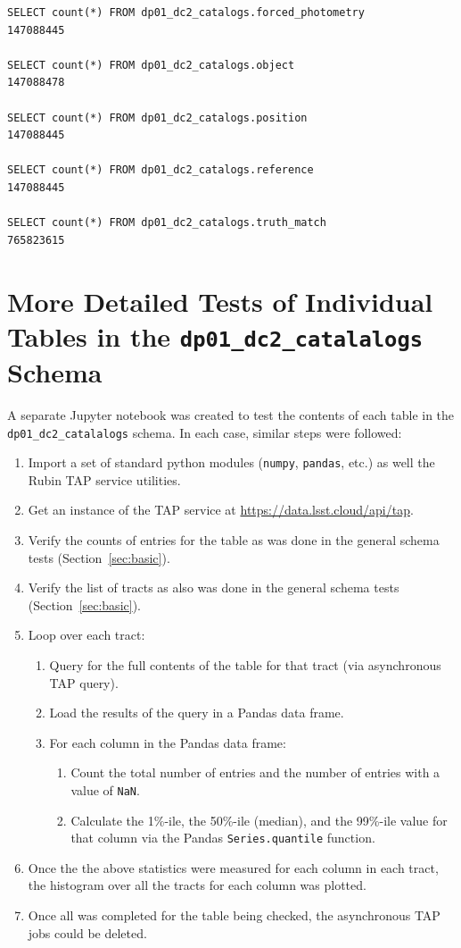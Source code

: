 \documentclass[DM,authoryear,toc]{lsstdoc}
\begin{document}
\lstset{language=SQL}
\begin{lstlisting}
SELECT count(*) FROM dp01_dc2_catalogs.forced_photometry
147088445

SELECT count(*) FROM dp01_dc2_catalogs.object
147088478

SELECT count(*) FROM dp01_dc2_catalogs.position
147088445
 
SELECT count(*) FROM dp01_dc2_catalogs.reference
147088445

SELECT count(*) FROM dp01_dc2_catalogs.truth_match
765823615
\end{lstlisting}


\section{More Detailed Tests of Individual Tables in the  \texttt{dp01\_dc2\_catalalogs} Schema} \label{sec:detailed}

A separate Jupyter notebook was created to test the contents of each
table in the \texttt{dp01\_dc2\_catalalogs} schema.  In each case,
similar steps were followed:
\begin{enumerate}
\item Import a set of standard python modules (\texttt{numpy},
  \texttt{pandas}, etc.) as well the Rubin TAP service utilities.
\item Get an instance of the TAP service at
  \url{https://data.lsst.cloud/api/tap}.
\item Verify the counts of entries for the table as was done in the
  general schema tests (Section~\ref{sec:basic}).
\item Verify the list of tracts as also was done in the general schema
  tests (Section~\ref{sec:basic}).
\item Loop over each tract:
  \begin{enumerate}
  \item Query for the full contents of the table for that tract (via asynchronous TAP query).
  \item Load the results of the query in a Pandas data frame.
  \item For each column in the Pandas data frame:
    \begin{enumerate}
    \item Count the total number of entries and the number of entries with a value of \texttt{NaN}.
    \item Calculate the 1\%-ile, the 50\%-ile (median), and the 99\%-ile value for that column via the Pandas \texttt{Series.quantile} function.
    \end{enumerate}
  \end{enumerate}
\item Once the the above statistics were measured for each column in each tract, the histogram over all the tracts for each column was plotted.
\item Once all was completed for the table being checked, the asynchronous TAP jobs could be deleted.
\end{enumerate}
\end{document}
